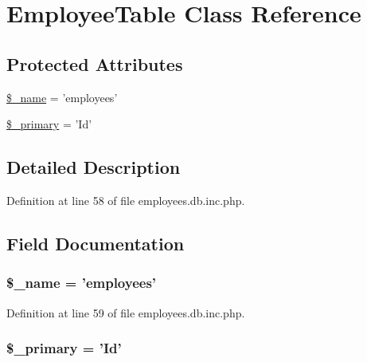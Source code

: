 \hypertarget{class_employee_table}{\section{\-Employee\-Table \-Class \-Reference}
\label{class_employee_table}
}
\subsection*{\-Protected \-Attributes}
\begin{DoxyCompactItemize}
\item 
\hyperlink{class_employee_table_a1c89defaf5aa7ac8e526065e8572f580}{\$\-\_\-name} = 'employees'
\item 
\hyperlink{class_employee_table_a75191b8d0631b8a5fd6e3405351a22ec}{\$\-\_\-primary} = '\-Id'
\end{DoxyCompactItemize}


\subsection{\-Detailed \-Description}


\-Definition at line 58 of file employees.\-db.\-inc.\-php.



\subsection{\-Field \-Documentation}
\hypertarget{class_employee_table_a1c89defaf5aa7ac8e526065e8572f580}{
\subsubsection[{\$\-\_\-name}]{\setlength{\rightskip}{0pt plus 5cm}\$\-\_\-name = 'employees'}}\label{class_employee_table_a1c89defaf5aa7ac8e526065e8572f580}


\-Definition at line 59 of file employees.\-db.\-inc.\-php.

\hypertarget{class_employee_table_a75191b8d0631b8a5fd6e3405351a22ec}{
\subsubsection[{\$\-\_\-primary}]{\setlength{\rightskip}{0pt plus 5cm}\$\-\_\-primary = '\-Id'}}\label{class_employee_table_a75191b8d0631b8a5fd6e3405351a22ec}


